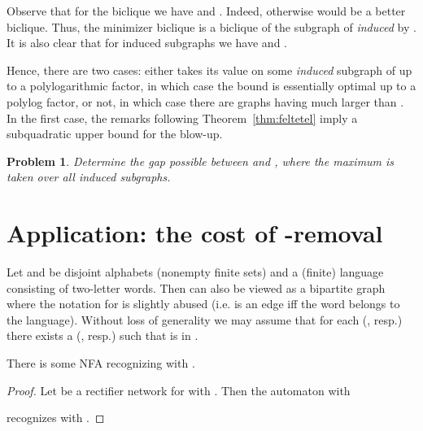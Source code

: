 \documentclass[submission]{llncs}
\newtheorem{openproblem}{Problem}
\begin{document}
  Observe that for the biclique 
  we have  and . Indeed, otherwise  would be a better biclique.
  Thus, the minimizer biclique  is a biclique of the subgraph of  \emph{induced} by .
  It is also clear that for induced subgraphs  we have  and .

  Hence, there are two cases:
  either  takes its value on some \emph{induced} subgraph of  up to a polylogarithmic factor,
  in which case the bound  is essentially optimal up to a polylog factor,
  or not, in which case there are graphs having much larger  than .
  In the first case, the remarks following Theorem~\ref{thm:feltetel} imply a subquadratic upper bound for the blow-up.











  \begin{openproblem}
  Determine the gap possible between  and , where the maximum is taken over all induced subgraphs.
  \end{openproblem}


\section{Application: the cost of -removal}
\label{sec-app}
Let  and  be disjoint alphabets (nonempty finite sets) and  a (finite) language consisting of two-letter words.
Then  can also be viewed as a bipartite graph  where the notation for  is slightly abused (i.e.  is an edge
iff the word  belongs to the language). Without loss of generality we may assume that for each  (, resp.)
there exists a  (, resp.) such that  is in .

\begin{proposition}
There is some NFA  recognizing  with .
\end{proposition}
\begin{proof}
Let  be a rectifier network for 
with .
Then the automaton  with

recognizes  with .
\end{proof}
\end{document}
